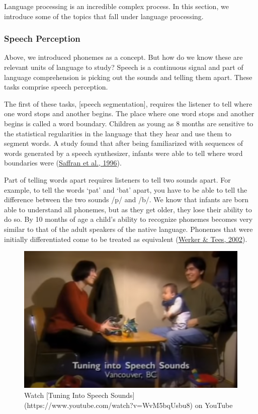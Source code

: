 \documentclass[
]{krantz}
\begin{document}
Language processing is an incredible complex process. In this section, we introduce some of the topics that fall under language processing.

\hypertarget{speech-perception}{%
\subsubsection*{Speech Perception}\label{speech-perception}}


Above, we introduced phonemes as a concept. But how do we know these are relevant units of language to study? Speech is a continuous signal and part of language comprehension is picking out the sounds and telling them apart. These tasks comprise speech perception.

The first of these tasks, {[}speech segmentation{]}, requires the listener to tell where one word stops and another begins. The place where one word stops and another begins is called a word boundary. Children as young as 8 months are sensitive to the statistical regularities in the language that they hear and use them to segment words. A study found that after being familiarized with sequences of words generated by a speech synthesizer, infants were able to tell where word boundaries were (\protect\hyperlink{ref-saffran1996}{Saffran et al., 1996}).

Part of telling words apart requires listeners to tell two sounds apart. For example, to tell the words `pat' and `bat' apart, you have to be able to tell the difference between the two sounds /p/ and /b/. We know that infants are born able to understand all phonemes, but as they get older, they lose their ability to do so. By 10 months of age a child's ability to recognize phonemes becomes very similar to that of the adult speakers of the native language. Phonemes that were initially differentiated come to be treated as equivalent (\protect\hyperlink{ref-Werker2002}{Werker \& Tees, 2002}).

\begin{figure}

{\centering \includegraphics[width=0.5\linewidth]{images/ch8/tuning_into_speech_sounds} 

}

\caption{Watch [Tuning Into Speech Sounds](https://www.youtube.com/watch?v=WvM5bqUsbu8) on YouTube}\label{fig:speechsounds}
\end{figure}
\end{document}
